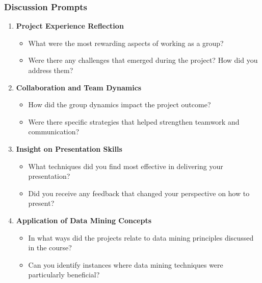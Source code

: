 \documentclass[aspectratio=169]{beamer}
\begin{document}
\begin{frame}[fragile]
    \frametitle{Discussion Prompts}
    \begin{enumerate}
        \item \textbf{Project Experience Reflection}
            \begin{itemize}
                \item What were the most rewarding aspects of working as a group?
                \item Were there any challenges that emerged during the project? How did you address them?
            \end{itemize}
        
        \item \textbf{Collaboration and Team Dynamics}
            \begin{itemize}
                \item How did the group dynamics impact the project outcome?
                \item Were there specific strategies that helped strengthen teamwork and communication?
            \end{itemize}
        
        \item \textbf{Insight on Presentation Skills}
            \begin{itemize}
                \item What techniques did you find most effective in delivering your presentation?
                \item Did you receive any feedback that changed your perspective on how to present?
            \end{itemize}
        
        \item \textbf{Application of Data Mining Concepts}
            \begin{itemize}
                \item In what ways did the projects relate to data mining principles discussed in the course?
                \item Can you identify instances where data mining techniques were particularly beneficial?
            \end{itemize}
    \end{enumerate}
\end{frame}
\end{document}
